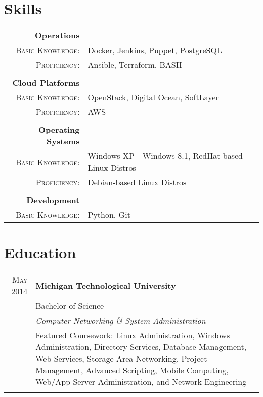 \documentclass[a4paper,9pt]{extarticle}
\begin{document}
\section{Skills}
\begin{tabular}{rl}
 \textbf{Operations}&\\\textsc{Basic Knowledge:}&\footnotesize{Docker, Jenkins, Puppet, PostgreSQL}\\\textsc{Proficiency:}&\footnotesize{Ansible, Terraform, BASH}\\\multicolumn{2}{c}{}\\
 \textbf{Cloud Platforms}&\\\textsc{Basic Knowledge:}&\footnotesize{OpenStack, Digital Ocean, SoftLayer}\\\textsc{Proficiency:}&\footnotesize{AWS}\\\multicolumn{2}{c}{}\\
 \textbf{Operating Systems}&\\\textsc{Basic Knowledge:}&\footnotesize{Windows XP - Windows 8.1, RedHat-based Linux Distros}\\\textsc{Proficiency:}&\footnotesize{Debian-based Linux Distros}\\\multicolumn{2}{c}{}\\
 \textbf{Development}&\\\textsc{Basic Knowledge:}&\footnotesize{Python, Git}
\end{tabular}

\section{Education}
\begin{tabular}{rp{8.5cm}}
 \textsc{May 2014}&\textbf{Michigan Technological University}\\&Bachelor of Science\\&\emph{Computer Networking \& System Administration}\\&\footnotesize{Featured Coursework: Linux Administration, Windows Administration, Directory Services, Database Management, Web Services, Storage Area Networking, Project Management, Advanced Scripting, Mobile Computing, Web/App Server Administration, and Network Engineering}\\\multicolumn{2}{c}{}\\
\end{tabular}
\end{document}
